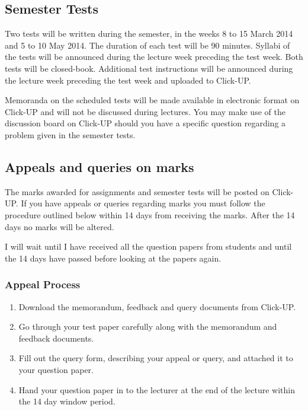     \subsection{Semester Tests}
        Two tests will be written during the semester, in the weeks 8 to 15
        March 2014 and 5 to 10 May 2014. The duration of each test will be
        90 minutes. Syllabi of the tests will be announced during the lecture
        week preceding the test week. Both tests will be closed-book.
        Additional test instructions will be announced during the lecture
        week preceding the test week and uploaded to Click-UP.

        Memoranda on the scheduled tests will be made available in electronic
        format on Click-UP and will not be discussed during lectures. You may
        make use of the discussion board on Click-UP should you have a specific
        question regarding a problem given in the semester tests.

    \subsection{Appeals and queries on marks}
        The marks awarded for assignments and semester tests will be
        posted on Click-UP. If you have appeals or queries regarding marks
        you must follow the procedure outlined below within 14 days from
        receiving the marks. After the 14 days no marks will be altered.

        I will wait until I have received all the question papers from
        students and until the 14 days have passed before looking at the
        papers again.

        \subsubsection{Appeal Process}
            \begin{enumerate}
                \item Download the memorandum, feedback and query documents
                    from Click-UP.
                \item Go through your test paper carefully along with the
                    memorandum and feedback documents.
                \item Fill out the query form, describing your appeal or query,
                    and attached it to your question paper.
                \item Hand your question paper in to the lecturer at the end of
                    the lecture within the 14 day window period.
            \end{enumerate}

